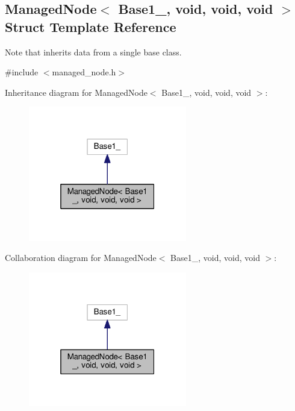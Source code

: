 \hypertarget{structManagedNode_3_01Base1___00_01void_00_01void_00_01void_01_4}{}\subsection{Managed\+Node$<$ Base1\+\_\+, void, void, void $>$ Struct Template Reference}
\label{structManagedNode_3_01Base1___00_01void_00_01void_00_01void_01_4}


Note that inherits data from a single base class.  




{\ttfamily \#include $<$managed\+\_\+node.\+h$>$}



Inheritance diagram for Managed\+Node$<$ Base1\+\_\+, void, void, void $>$\+:\nopagebreak
\begin{figure}[H]
\begin{center}
\leavevmode
\includegraphics[width=196pt]{structManagedNode_3_01Base1___00_01void_00_01void_00_01void_01_4__inherit__graph}
\end{center}
\end{figure}


Collaboration diagram for Managed\+Node$<$ Base1\+\_\+, void, void, void $>$\+:\nopagebreak
\begin{figure}[H]
\begin{center}
\leavevmode
\includegraphics[width=196pt]{structManagedNode_3_01Base1___00_01void_00_01void_00_01void_01_4__coll__graph}
\end{center}
\end{figure}
